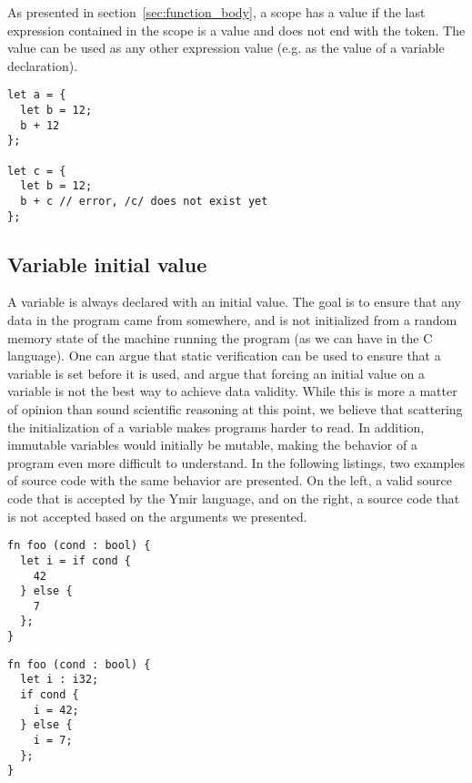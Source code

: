 As presented in section~\ref{sec:function_body}, a scope has a value if the last
expression contained in the scope is a value and does not end with the
\token{;} token. The value can be used as any other expression value (e.g. as
the value of a variable declaration).

\begin{lstlisting}[style=coloredverbatim]
let a = {
  let b = 12;
  b + 12
};

let c = {
  let b = 12;
  b + c // error, /c/ does not exist yet
};
\end{lstlisting}

\subsection{Variable initial value}

A variable is always declared with an initial value. The goal is to ensure that
any data in the program came from somewhere, and is not initialized from a
random memory state of the machine running the program (as we can have in the C
language). One can argue that static verification can be used to ensure that a
variable is set before it is used, and argue that forcing an initial value on a
variable is not the best way to achieve data validity. While this is more a
matter of opinion than sound scientific reasoning at this point, we believe that
scattering the initialization of a variable makes programs harder to read. In
addition, immutable variables would initially be mutable, making the behavior of
a program even more difficult to understand. In the following listings, two
examples of source code with the same behavior are presented. On the left, a
valid source code that is accepted by the Ymir language, and on the right, a
source code that is not accepted based on the arguments we presented.

\hspace{-15pt}%
\begin{minipage}[t][][t]{0.47\linewidth}
  \begin{lstlisting}[style=coloredverbatim, caption=Valid]
fn foo (cond : bool) {
  let i = if cond {
    42
  } else {
    7
  };
}
  \end{lstlisting}
\end{minipage}\hspace{10pt}%
\begin{minipage}[t][][t]{0.47\linewidth}
  \begin{lstlisting}[style=coloredverbatim, caption=Invalid]
fn foo (cond : bool) {
  let i : i32;
  if cond {
    i = 42;
  } else {
    i = 7;
  };
}
  \end{lstlisting}
\end{minipage}


